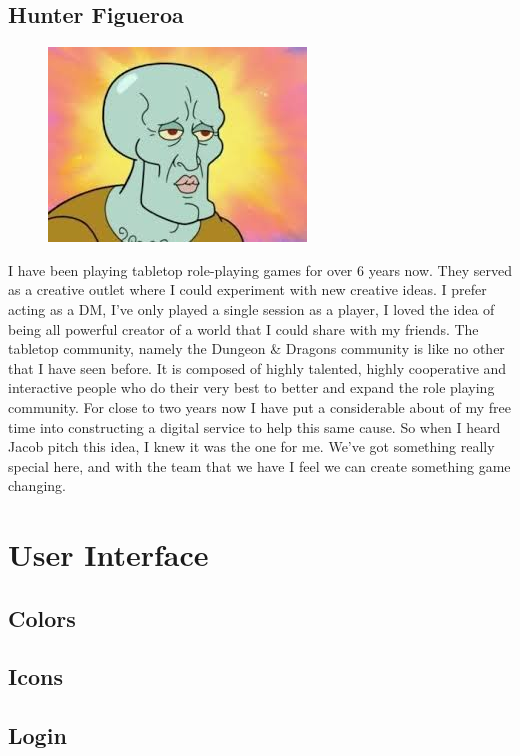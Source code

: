 \documentclass[12pt,a4paper]{report}
\begin{document}
	\newpage
	\section{Hunter Figueroa}
	\begin{figure}
		\includegraphics[scale=0.05]{Hunter_Figueroa}
	\end{figure}
	I have been playing tabletop role-playing games for over 6 years now. They served as a creative outlet where I could experiment with new creative ideas. I prefer acting as a DM, I’ve only played a single session as a player, I loved the idea of being all powerful creator of a world that I could share with my friends. The tabletop community, namely the Dungeon \& Dragons community is like no other that I have seen before. It is composed of highly talented, highly cooperative  and interactive people who do their very best to better and expand the role playing community. For close to two years now I have put a considerable about of my free time into constructing a digital service to help this same cause. So when I heard Jacob pitch this idea, I knew it was the one for me. We’ve got something really special here, and with the team that we have I feel we can create something game changing.
	
\newpage
\chapter*{User Interface}
	\section{Colors}
	\section{Icons}
	\section{Login}
\end{document}
